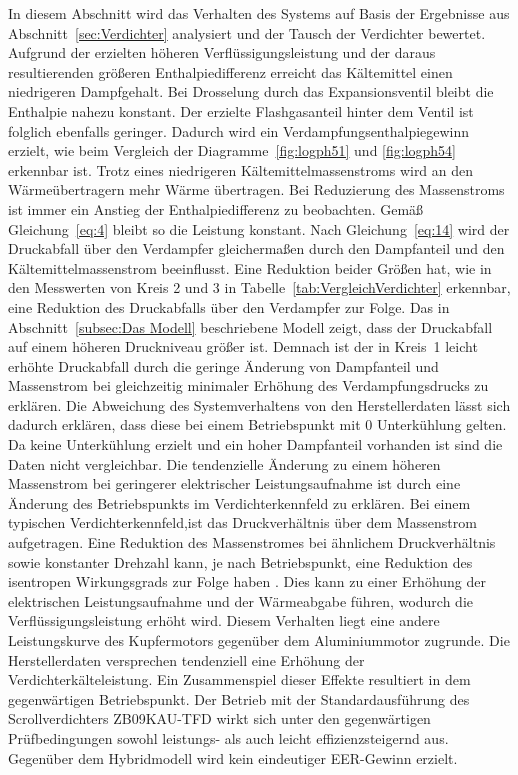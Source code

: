 In diesem Abschnitt wird das Verhalten des Systems auf Basis der Ergebnisse aus Abschnitt~\ref{sec:Verdichter} analysiert und der Tausch der Verdichter bewertet. 
Aufgrund der erzielten höheren Verflüssigungsleistung und der daraus resultierenden größeren Enthalpiedifferenz erreicht das Kältemittel einen niedrigeren Dampfgehalt. Bei Drosselung durch das Expansionsventil bleibt die Enthalpie nahezu konstant. Der erzielte Flashgasanteil hinter dem Ventil ist folglich ebenfalls geringer. Dadurch wird ein Verdampfungsenthalpiegewinn erzielt, wie beim Vergleich der Diagramme~\ref{fig:logph51} und \ref{fig:logph54} erkennbar ist. Trotz eines niedrigeren Kältemittelmassenstroms wird an den Wärmeübertragern mehr Wärme übertragen. Bei Reduzierung des Massenstroms ist immer ein Anstieg der Enthalpiedifferenz zu beobachten. Gemäß Gleichung~\ref{eq:4} bleibt so die Leistung konstant. \newline
Nach Gleichung~\ref{eq:14} wird der Druckabfall über den Verdampfer gleichermaßen durch den Dampfanteil und den Kältemittelmassenstrom beeinflusst. Eine Reduktion beider Größen hat, wie in den Messwerten von Kreis 2 und 3 in Tabelle~\ref{tab:VergleichVerdichter} erkennbar, eine Reduktion des Druckabfalls über den Verdampfer zur Folge. Das in Abschnitt~\ref{subsec:Das Modell} beschriebene Modell zeigt, dass der Druckabfall auf einem höheren Druckniveau größer ist. Demnach ist der in Kreis~1 leicht erhöhte Druckabfall durch die geringe Änderung von Dampfanteil und Massenstrom bei gleichzeitig minimaler Erhöhung des Verdampfungsdrucks zu erklären. \newline
Die Abweichung des Systemverhaltens von den Herstellerdaten lässt sich dadurch erklären, dass diese bei einem Betriebspunkt mit \unit{0}{\kelvin} Unterkühlung gelten. Da keine Unterkühlung erzielt und ein hoher Dampfanteil vorhanden ist sind die Daten nicht vergleichbar. Die tendenzielle Änderung zu einem höheren Massenstrom bei geringerer elektrischer Leistungsaufnahme ist durch eine Änderung des Betriebspunkts im Verdichterkennfeld zu erklären. Bei einem typischen Verdichterkennfeld,ist das Druckverhältnis über dem Massenstrom aufgetragen. Eine Reduktion des Massenstromes bei ähnlichem Druckverhältnis sowie konstanter Drehzahl kann, je nach Betriebspunkt, eine Reduktion des isentropen Wirkungsgrads zur Folge haben \cite{Wilke.2005}. 
Dies kann zu einer Erhöhung der elektrischen Leistungsaufnahme und der Wärmeabgabe führen, wodurch die Verflüssigungsleistung erhöht wird. Diesem Verhalten liegt eine andere Leistungskurve des Kupfermotors gegenüber dem Aluminiummotor zugrunde. Die Herstellerdaten versprechen tendenziell eine Erhöhung der Verdichterkälteleistung. Ein Zusammenspiel dieser Effekte resultiert in dem gegenwärtigen Betriebspunkt.  \newline
Der Betrieb mit der Standardausführung des Scrollverdichters ZB09KAU-TFD wirkt sich unter den gegenwärtigen Prüfbedingungen sowohl leistungs- als auch leicht effizienzsteigernd aus. Gegenüber dem Hybridmodell wird kein eindeutiger EER-Gewinn erzielt.


